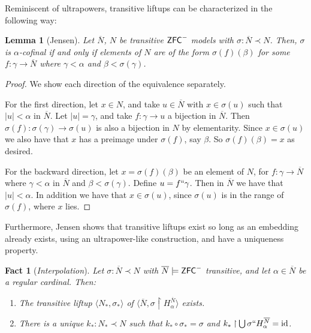 \documentclass{amsart}
\newtheorem{lemma}[theorem]{Lemma}
\newtheorem{fact}[theorem]{Fact}
\theoremstyle{definition}
\theoremstyle{remark}
\newcommand{\N}{{\overline{N}}}
\newcommand{\ZFC}{\textup{\ensuremath{\textsf{ZFC}}}}
\newcommand{\id}{\textup{\ensuremath{\text{id}}}}
\newcommand{\rest}{\mathbin{\upharpoonright}}
\begin{document}
Reminiscent of ultrapowers, transitive liftups can be characterized in the following way:
\begin{lemma}[Jensen] \label{lemma:liftupchar} Let $\N$, $N$ be transitive $\ZFC^-$ models with $\sigma: \N \prec N$. Then,
$\sigma$ is $\alpha$-cofinal if and only if elements of $N$ are of the form $\sigma(f)(\beta)$ for some $f: \gamma \to \overline N$ where $\gamma < \alpha$ and $\beta < \sigma(\gamma)$. \end{lemma} 
\begin{proof} We show each direction of the equivalence separately.

For the first direction, let $x \in N$, and take $u \in \overline N$ with $x \in \sigma(u)$ such that $|u| <\alpha$ in $\overline N$. Let $|u|=\gamma$, and take $f:\gamma \to u$ a bijection in $\overline N$. Then $\sigma(f):\sigma(\gamma) \to \sigma(u)$ is also a bijection in $N$ by elementarity. Since $x \in \sigma(u)$ we also have that $x$ has a preimage under $\sigma(f)$, say $\beta$. So $\sigma(f)(\beta)=x$ as desired.

For the backward direction, let $x=\sigma(f)(\beta)$ be an element of $N$, for $f:\gamma \to \overline N$ where $\gamma < \alpha$ in $\overline N$ and $\beta < \sigma(\gamma)$. Define $u = f``\gamma$. Then in $\overline N$ we have that $|u|<\alpha$. In addition we have that $x \in \sigma(u)$, since $\sigma(u)$ is in the range of $\sigma(f)$, where $x$ lies.
\end{proof}

Furthermore, Jensen shows that transitive liftups exist so long as an embedding already exists, using an ultrapower-like construction, and have a uniqueness property.

\begin{fact}[\emph{Interpolation}]\label{fact:Interpolation} Let $\sigma:\N \prec N$ with $\N \models \ZFC^-$ transitive, and let $\alpha \in \N$ be a regular cardinal. Then: \begin{enumerate}
	\item The transitive liftup $\langle N_*, \sigma_* \rangle$ of $\langle \N, \sigma \rest H^{\N}_\alpha \rangle$ exists.
	\item There is a unique $k_*:N_* \prec N$ such that $k_* \circ \sigma_* = \sigma$ and $k_* \rest \bigcup \sigma `` H^{\N}_\alpha = \id$.
\end{enumerate}
\end{fact} 
\end{document}
